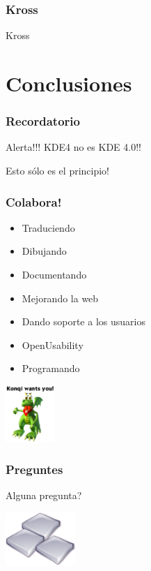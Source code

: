 \documentclass[12pt]{beamer}
\begin{document}
\begin {frame}
\frametitle{Kross}
\begin{center}
\huge { Kross }
\end{center}
\end {frame}

\section {Conclusiones}
\begin{frame}
	\frametitle{Recordatorio}
	\begin{alertblock}{Alerta!!!}
		KDE4 no es KDE 4.0!!
	\end{alertblock}
	Esto sólo es el principio!
\end{frame}
\begin{frame}
	\frametitle{Colabora!}
	
	\begin{itemize}
	\item Traduciendo
	\item Dibujando
	\item Documentando
	\item Mejorando la web
	\item Dando soporte a los usuarios
	\item OpenUsability
	\item Programando
	\end{itemize}
	
	\begin{flushright}
		\includegraphics[width=70px]{imatges/konqi.png}
	\end{flushright}
\end{frame}
\begin{frame}
\frametitle{Preguntes}
\huge { Alguna pregunta? }
\begin{flushright}
	\includegraphics[width=100px]{imatges/blocs.png}
\end{flushright}
\end{frame}
\end{document}
